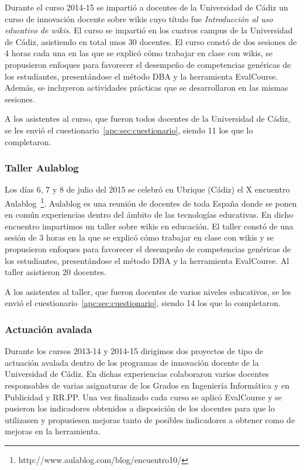 		Durante el curso 2014-15 se impartió a docentes de la Universidad de Cádiz un curso de innovación docente sobre wikis cuyo título fue \emph{Introducción al uso educativo de wikis}. El curso se impartió en los cuatros campus de la Universidad de Cádiz, asistiendo en total unos 30 docentes. El curso constó de dos sesiones de 4 horas cada una en las que se explicó cómo trabajar en clase con wikis, se propusieron enfoques para favorecer el desempeño de competencias genéricas de los estudiantes, presentándose el método DBA y la herramienta EvalCourse.  Además, se incluyeron actividades prácticas que se desarrollaron en las mismas sesiones. 

A los asistentes al curso, que fueron todos docentes de la Universidad de Cádiz, se les envió el cuestionario~\ref{apc:sec:cuestionario}, siendo 11 los que lo completaron.

	\subsubsection{Taller Aulablog}

		Los días 6, 7 y 8 de julio del 2015 se celebró en Ubrique (Cádiz) el X encuentro Aulablog~\footnote{http://www.aulablog.com/blog/encuentro10/}. Aulablog es una reunión de docentes de toda España donde se ponen en común experiencias  dentro del ámbito de las tecnologías educativas. En dicho encuentro impartimos un taller sobre wikis en educación. El taller constó de una sesión de 3 horas en la que se explicó cómo trabajar en clase con wikis y se propusieron enfoques para favorecer el desempeño de competencias genéricas de los estudiantes, presentándose el método DBA y la herramienta EvalCourse. Al taller asistieron 20 docentes.

A los asistentes al taller, que fueron docentes de varios niveles educativos, se les envió el cuestionario~\ref{apc:sec:cuestionario}, siendo 14 los que lo completaron.

	\subsubsection{Actuación avalada}

		Durante los cursos 2013-14 y 2014-15 dirigimos dos proyectos de tipo de actuación avalada dentro de los programas de innovación docente de la Universidad de Cádiz. En dichas experiencias colaboraron varios docentes responsables de varias asignaturas de los Grados en Ingeniería Informática y en Publicidad y RR.PP. Una vez finalizado cada curso se aplicó EvalCourse y se pusieron los indicadores obtenidos a disposición de los docentes para que lo utilizasen y propusiesen mejoras tanto de posibles indicadores a obtener como de mejoras en la herramienta.

